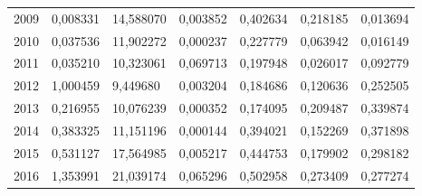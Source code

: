 \begin{table}
\begin{tabular}{p{1cm}p{2cm}p{2cm}p{2cm}p{2cm}p{2cm}p{2cm}}
 2009 &                               0,008331 &                                   14,588070 &                            0,003852 &     0,402634 &                    0,218185 &                         0,013694 \\
 2010 &                               0,037536 &                                   11,902272 &                            0,000237 &     0,227779 &                    0,063942 &                         0,016149 \\
 2011 &                               0,035210 &                                   10,323061 &                            0,069713 &     0,197948 &                    0,026017 &                         0,092779 \\
 2012 &                               1,000459 &                                    9,449680 &                            0,003204 &     0,184686 &                    0,120636 &                         0,252505 \\
 2013 &                               0,216955 &                                   10,076239 &                            0,000352 &     0,174095 &                    0,209487 &                         0,339874 \\
 2014 &                               0,383325 &                                   11,151196 &                            0,000144 &     0,394021 &                    0,152269 &                         0,371898 \\
 2015 &                               0,531127 &                                   17,564985 &                            0,005217 &     0,444753 &                    0,179902 &                         0,298182 \\
 2016 &                               1,353991 &                                   21,039174 &                            0,065296 &     0,502958 &                    0,273409 &                         0,277274 \\
\bottomrule
\end{tabular}
\end{table}
